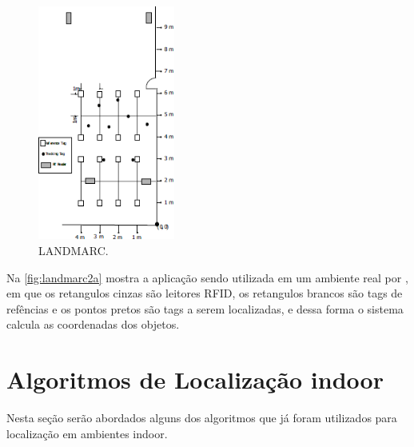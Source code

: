     \begin{figure}[H]
              \caption{\label{fig:landmarc2a}{LANDMARC.}}
              \centering
              \includegraphics[width=0.4\textwidth]{Figuras/landmarc2a.png}
        \end{figure}
    \par
    Na \autoref{fig:landmarc2a} mostra a aplicação sendo utilizada em um ambiente real por \citeauthor{landmarc}, em que os retangulos cinzas são leitores RFID, os retangulos brancos são tags de refências e os pontos pretos são tags a serem localizadas, e dessa forma o sistema calcula as coordenadas dos objetos.

\section{Algoritmos de Localização indoor}
Nesta seção serão abordados alguns dos algoritmos que já foram utilizados para localização em ambientes indoor.
